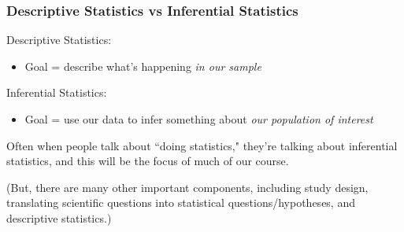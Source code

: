 \documentclass[12pt, 
hyperref={colorlinks=true, linkcolor=blue, urlcolor=cyan}]{beamer}
\begin{document}
\begin{frame}
\frametitle{Descriptive Statistics vs Inferential Statistics}

\color{blue} Descriptive Statistics: \color{black}
\begin{itemize}
\item Goal = \color{blue} describe \color{black} what's happening \color{blue} \textit{in our sample} \color{black}
\end{itemize}

\color{orange} Inferential Statistics: \color{black}
\begin{itemize}
\item Goal = use our data to \color{orange} infer \color{black} something about \color{orange} \textit{our population of interest} \color{black}
\end{itemize}

Often when people talk about ``doing statistics," they're talking about inferential statistics, and this will be the focus of much of our course. \begin{footnotesize}(But, there are many other important components, including study design, translating scientific questions into statistical questions/hypotheses, and descriptive statistics.) \end{footnotesize}

\end{frame}
\end{document}
